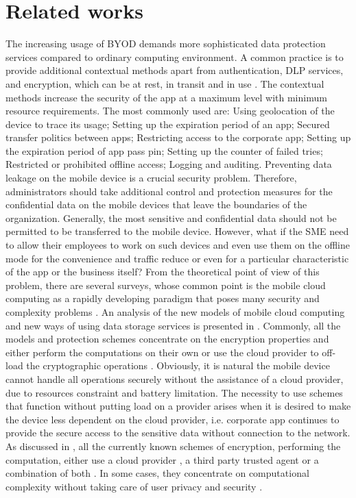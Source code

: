 \documentclass[twocolumn]{svjour3}          %
\begin{document}
\section{Related works}
\label{sec_related_works}
The increasing usage of BYOD demands more sophisticated data protection services compared to ordinary computing environment. A common practice is to provide additional contextual methods apart from authentication, DLP services, and encryption, which can be at rest, in transit and in use \cite{yovel2014, khan2015cloud, khan2014survey, khan2013towards}. The contextual methods increase the security of the app at a maximum level with minimum resource requirements. The most commonly used are:
Using geolocation of the device to trace its usage;
Setting up the expiration period of an app;
Secured transfer politics between apps;
Restricting access to the corporate app;
Setting up the expiration period of app pass pin;
Setting up the counter of failed tries;
Restricted or prohibited offline access;
Logging and auditing.
Preventing data leakage on the mobile device is a crucial security problem. Therefore, administrators should take additional control and protection measures for the confidential data on the mobile devices that leave the boundaries of the organization. Generally, the most sensitive and confidential data should not be permitted to be transferred to the mobile device. However, what if the SME need to allow their employees to work on such devices and even use them on the offline mode for the convenience and traffic reduce or even for a particular characteristic of the app or the business itself?
From the theoretical point of view of this problem, there are several surveys, whose common point is the mobile cloud computing as a rapidly developing paradigm that poses many security and complexity problems \cite{yovel2014, khan2015cloud, khan2014survey, khan2013towards}. An analysis of the new models of mobile cloud computing and new ways of using data storage services is presented in \cite{khan2015cloud, khan2013towards}. Commonly, all the models and protection schemes concentrate on the encryption properties and either perform the computations on their own \cite{zhao2010trusted, yang2011provable} or use the cloud provider to off-load the cryptographic operations \cite{itani2010energy, ren2011lightweight}. Obviously, it is natural the mobile device cannot handle all operations securely without the assistance of a cloud provider, due to resources constraint and battery limitation.
The necessity to use schemes that function without putting load on a provider arises when it is desired to make the device less dependent on the cloud provider, i.e. corporate app continues to provide the secure access to the sensitive data without connection to the network. As discussed in \cite{khan2015cloud}, all the currently known schemes of encryption, performing the computation, either use a cloud provider \cite{zhao2010trusted}, a third party trusted agent \cite{yang2011provable} or a combination of both \cite{itani2010energy}. In some cases, they concentrate on computational complexity without taking care of user privacy and security \cite{ren2011lightweight}.
\end{document}
